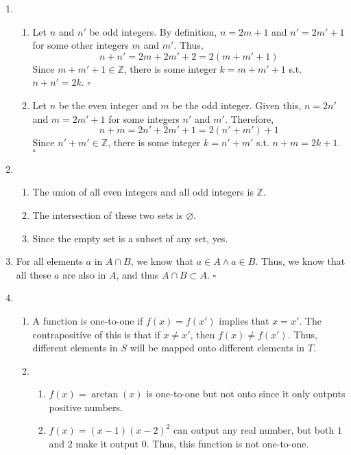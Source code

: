 \documentclass[12pt]{article}
\begin{document}
\begin{enumerate}
    \item \begin{enumerate}
              \item Let $n$ and $n'$ be odd integers.
                    By definition, $n=2m+1$ and $n'=2m'+1$ for some other integers $m$ and $m'$.
                    Thus, \[n+n'=2m+2m'+2=2(m+m'+1)\]
                    Since $m+m'+1 \in \mathbb{Z}$, there is some integer $k=m+m'+1$ s.t. $n+n'=2k$. $\square$
              \item Let $n$ be the even integer and $m$ be the odd integer.
                    Given this, $n=2n'$ and $m=2m'+1$ for some integers $n'$ and $m'$.
                    Therefore, \[n+m=2n'+2m'+1=2(n'+m')+1\]
                    Since $n'+m' \in \mathbb{Z}$, there is some integer $k=n'+m'$ s.t. $n+m=2k+1$. $\square$
          \end{enumerate}
    \item \begin{enumerate}
              \item The union of all even integers and all odd integers is $\boxed{\mathbb{Z}}$.
              \item The intersection of these two sets is $\boxed{\varnothing}$.
              \item Since the empty set is a subset of any set, yes.
          \end{enumerate}
    \item For all elements $a$ in $A \cap B$, we know that $a \in A \land a \in B$.
          Thus, we know that all these $a$ are also in $A$, and thus $A \cap B \subset A$. $\square$
    \item \begin{enumerate}
              \item A function is one-to-one if $f(x)=f(x')$ implies that $x=x'$.
                    The contrapositive of this is that if $x \ne x'$, then $f(x) \ne f(x')$.
                    Thus, different elements in $S$ will be mapped onto different elements in $T$.
              \item \begin{enumerate}
                        \item $f(x)=\arctan(x)$ is one-to-one but not onto since it only outputs positive numbers.
                        \item $f(x)=(x-1)(x-2)^2$ can output any real number, but both $1$ and $2$ make it output $0$.
                              Thus, this function is not one-to-one.

\end{enumerate}
\end{enumerate}
\end{enumerate}
\end{document}
